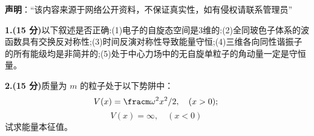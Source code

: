 
\textbf{声明}：“该内容来源于网络公开资料，不保证真实性，如有侵权请联系管理员”

\textbf{1.(15 分)}以下叙述是否正确:(1)电子的自旋态空间是3维的:(2)全同玻色子体系的波函数具有交换反对称性;(3)时间反演对称性导致能量守恒;(4)三维各向同性谐振子的所有能级均是非简并的;(5)处于中心力场中的无自旋单粒子的角动量一定是守恒量。

\textbf{2.(15 分)}质量为 $m$ 的粒子处于以下势阱中：
\[
V(x) = \fracm \omega^2 x^2/2, \quad (x > 0);~
\]
\[
V(x) = \infty, \quad (x < 0)~
\]
试求能量本征值。
